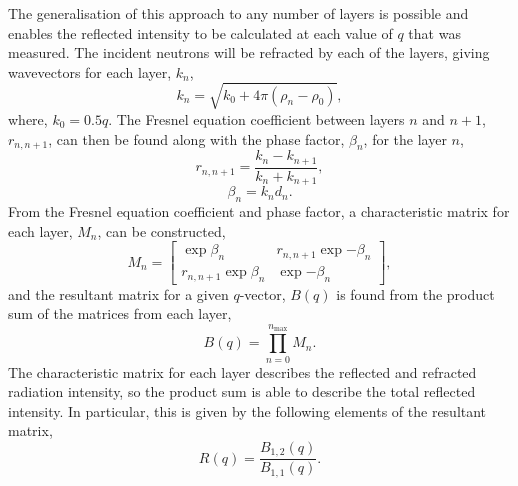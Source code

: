 \documentclass[
 reprint,
 superscriptaddress,
 amsmath,amssymb,
 aps,
]{revtex4-1}
\begin{document}
The generalisation of this approach to any number of layers is possible and enables the reflected intensity to be calculated at each value of $q$ that was measured. 
The incident neutrons will be refracted by each of the layers, giving wavevectors for each layer, $k_n$,
%
\begin{equation}
    k_n = \sqrt{k_0+4\pi(\rho_n - \rho_0)},
\end{equation}
%
where, $k_0 = 0.5q$. 
The Fresnel equation coefficient between layers $n$ and $n+1$, $r_{n, n+1}$, can then be found along with the phase factor, $\beta_n$, for the layer $n$, 
%
\begin{equation}
    r_{n, n+1} = \frac{k_n - k_{n+1}}{k_n + k_{n+1}}, 
    \label{equ:fres}
\end{equation}
%
%
\begin{equation}
    \beta_n = k_nd_n.
\end{equation}
%
From the Fresnel equation coefficient and phase factor, a characteristic matrix for each layer, $M_n$, can be constructed,
%
\begin{equation}
    M_n = 
    \begin{bmatrix}
        \exp{\beta_n} & r_{n,n+1}\exp{-\beta_n} \\ 
        r_{n,n+1}\exp{\beta_n} & \exp{-\beta_n}
    \end{bmatrix},
\end{equation}
%
and the resultant matrix for a given $q$-vector, $B(q)$ is found from the product sum of the matrices from each layer, 
%
\begin{equation}
    B(q) = \prod_{n=0}^{n_{\text{max}}}{M_n}.
\end{equation}
%
The characteristic matrix for each layer describes the reflected and refracted radiation intensity, so the product sum is able to describe the total reflected intensity. 
In particular, this is given by the following elements of the resultant matrix,
%
\begin{equation}
    R(q) = \frac{B_{1,2}(q)}{B_{1,1}(q)}. 
\end{equation}
%
\end{document}
